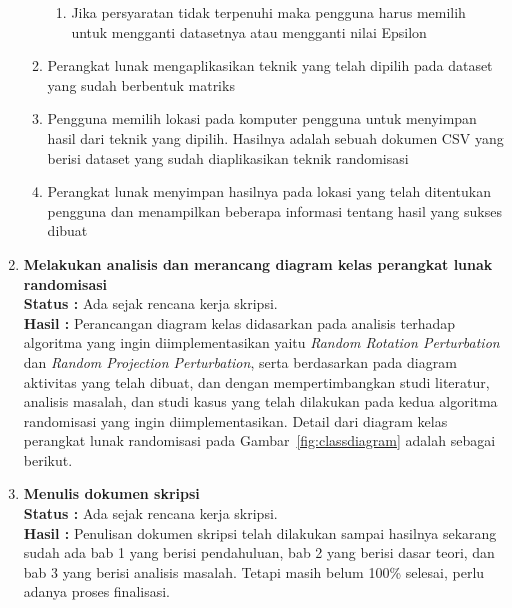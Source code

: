 \documentclass[a4paper,twoside]{article}
\begin{document}
\begin{enumerate}
\begin{enumerate}
\begin{enumerate}
				\item Jika persyaratan tidak terpenuhi maka pengguna harus memilih untuk mengganti datasetnya atau mengganti nilai Epsilon
			\end{enumerate}
			\item Perangkat lunak mengaplikasikan teknik yang telah dipilih pada dataset yang sudah berbentuk matriks
			\item Pengguna memilih lokasi pada komputer pengguna untuk menyimpan hasil dari teknik yang dipilih. Hasilnya adalah sebuah dokumen CSV yang berisi dataset yang sudah diaplikasikan teknik randomisasi
			\item Perangkat lunak menyimpan hasilnya pada lokasi yang telah ditentukan pengguna dan menampilkan beberapa informasi tentang hasil yang sukses dibuat
		\end{enumerate}


		\item \textbf{Melakukan analisis dan merancang diagram kelas perangkat lunak randomisasi}\\
		{\bf Status :} Ada sejak rencana kerja skripsi.\\
		{\bf Hasil :} Perancangan diagram kelas didasarkan pada analisis terhadap algoritma yang ingin diimplementasikan yaitu \textit{Random Rotation Perturbation} dan \textit{Random Projection Perturbation}, serta berdasarkan pada diagram aktivitas yang telah dibuat, dan dengan mempertimbangkan studi literatur, analisis masalah, dan studi kasus yang telah dilakukan pada kedua algoritma randomisasi yang ingin diimplementasikan. Detail dari diagram kelas perangkat lunak randomisasi pada Gambar~\ref{fig:classdiagram} adalah sebagai berikut.
		

		\item \textbf{Menulis dokumen skripsi}\\
		{\bf Status :} Ada sejak rencana kerja skripsi.\\
		{\bf Hasil :} Penulisan dokumen skripsi telah dilakukan sampai hasilnya sekarang sudah ada bab 1 yang berisi pendahuluan, bab 2 yang berisi dasar teori, dan bab 3 yang berisi analisis masalah. Tetapi masih belum 100\% selesai, perlu adanya proses finalisasi.
		
	\end{enumerate}
\end{document}
